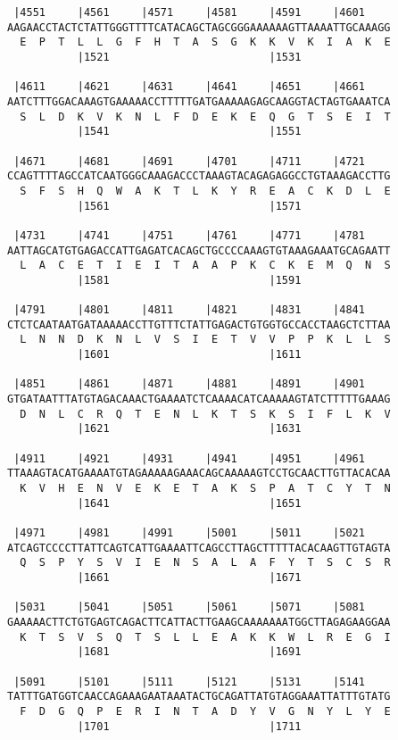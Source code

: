 \documentclass{article}
\begin{document}
\begin{Verbatim}
 |4551     |4561     |4571     |4581     |4591     |4601    
AAGAACCTACTCTATTGGGTTTTCATACAGCTAGCGGGAAAAAAGTTAAAATTGCAAAGG
  E  P  T  L  L  G  F  H  T  A  S  G  K  K  V  K  I  A  K  E
           |1521                         |1531              
  
 |4611     |4621     |4631     |4641     |4651     |4661    
AATCTTTGGACAAAGTGAAAAACCTTTTTGATGAAAAAGAGCAAGGTACTAGTGAAATCA
  S  L  D  K  V  K  N  L  F  D  E  K  E  Q  G  T  S  E  I  T
           |1541                         |1551              
  
 |4671     |4681     |4691     |4701     |4711     |4721    
CCAGTTTTAGCCATCAATGGGCAAAGACCCTAAAGTACAGAGAGGCCTGTAAAGACCTTG
  S  F  S  H  Q  W  A  K  T  L  K  Y  R  E  A  C  K  D  L  E
           |1561                         |1571              
  
 |4731     |4741     |4751     |4761     |4771     |4781    
AATTAGCATGTGAGACCATTGAGATCACAGCTGCCCCAAAGTGTAAAGAAATGCAGAATT
  L  A  C  E  T  I  E  I  T  A  A  P  K  C  K  E  M  Q  N  S
           |1581                         |1591              
  
 |4791     |4801     |4811     |4821     |4831     |4841    
CTCTCAATAATGATAAAAACCTTGTTTCTATTGAGACTGTGGTGCCACCTAAGCTCTTAA
  L  N  N  D  K  N  L  V  S  I  E  T  V  V  P  P  K  L  L  S
           |1601                         |1611              
  
 |4851     |4861     |4871     |4881     |4891     |4901    
GTGATAATTTATGTAGACAAACTGAAAATCTCAAAACATCAAAAAGTATCTTTTTGAAAG
  D  N  L  C  R  Q  T  E  N  L  K  T  S  K  S  I  F  L  K  V
           |1621                         |1631              
  
 |4911     |4921     |4931     |4941     |4951     |4961    
TTAAAGTACATGAAAATGTAGAAAAAGAAACAGCAAAAAGTCCTGCAACTTGTTACACAA
  K  V  H  E  N  V  E  K  E  T  A  K  S  P  A  T  C  Y  T  N
           |1641                         |1651              
  
 |4971     |4981     |4991     |5001     |5011     |5021    
ATCAGTCCCCTTATTCAGTCATTGAAAATTCAGCCTTAGCTTTTTACACAAGTTGTAGTA
  Q  S  P  Y  S  V  I  E  N  S  A  L  A  F  Y  T  S  C  S  R
           |1661                         |1671              
  
 |5031     |5041     |5051     |5061     |5071     |5081    
GAAAAACTTCTGTGAGTCAGACTTCATTACTTGAAGCAAAAAAATGGCTTAGAGAAGGAA
  K  T  S  V  S  Q  T  S  L  L  E  A  K  K  W  L  R  E  G  I
           |1681                         |1691              
  
 |5091     |5101     |5111     |5121     |5131     |5141    
TATTTGATGGTCAACCAGAAAGAATAAATACTGCAGATTATGTAGGAAATTATTTGTATG
  F  D  G  Q  P  E  R  I  N  T  A  D  Y  V  G  N  Y  L  Y  E
           |1701                         |1711              
  

\end{Verbatim}
\end{document}
